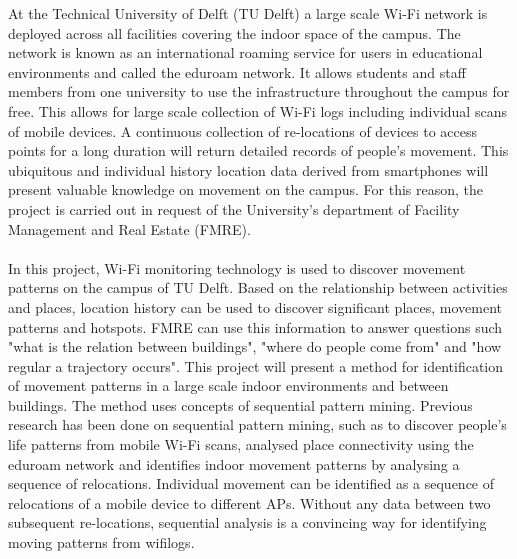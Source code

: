At the Technical University of Delft (TU Delft) a large scale Wi-Fi network is deployed across all facilities covering the indoor space of the campus. The network is known as an international roaming service for users in educational environments and called the eduroam network. It allows students and staff members from one university to use the infrastructure throughout the campus for free. This allows for large scale collection of Wi-Fi logs including individual scans of mobile devices.  A continuous collection of re-locations of devices to access points for a long duration will return detailed records of people’s movement. This ubiquitous and individual history location data derived from smartphones will present valuable knowledge on movement on the campus. For this reason, the project is carried out in request of the University’s department of Facility Management and Real Estate (FMRE).\\\\
In this project, Wi-Fi monitoring technology is used to discover movement
patterns on the campus of TU Delft. Based on the relationship between activities and places, location history can be used to discover significant places, movement patterns and hotspots. FMRE can use this information to answer questions such "what is the relation between buildings", "where do people come from" and "how regular a trajectory occurs". This project will present a method for identification of movement patterns in a large scale indoor environments and between buildings. The method uses concepts of sequential pattern mining. Previous research has been done on sequential pattern mining, such as \cite{zhao2014discovering} to discover people’s life patterns from mobile Wi-Fi scans, \cite{meneses2012large} analysed place connectivity using the eduroam network and \cite{radaelli2013identifying} identifies indoor movement patterns by analysing a sequence of relocations. Individual movement can be identified as a sequence of relocations of a mobile device to different APs. Without any data between two subsequent re-locations, sequential analysis is a convincing way for identifying moving patterns from wifilogs.
